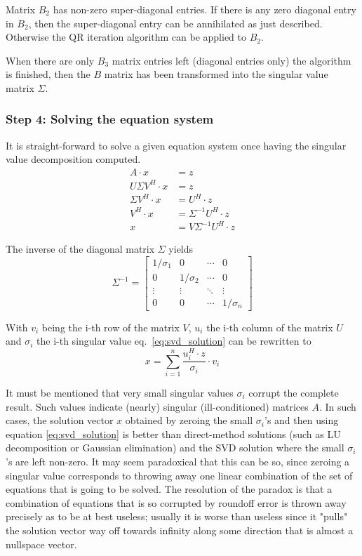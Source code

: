 Matrix $B_2$ has non-zero super-diagonal entries.  If there is any
zero diagonal entry in $B_2$, then the super-diagonal entry can be
annihilated as just described.  Otherwise the QR iteration algorithm
can be applied to $B_2$.

\addvspace{12pt}

When there are only $B_3$ matrix entries left (diagonal entries only)
the algorithm is finished, then the $B$ matrix has been transformed
into the singular value matrix $\Sigma$.

\subsubsection{Step 4: Solving the equation system}

It is straight-forward to solve a given equation system once having
the singular value decomposition computed.
\begin{align}
A\cdot x &= z\\
U\Sigma V^H\cdot x &= z\\
\Sigma V^H\cdot x &= U^H \cdot z\\
V^H\cdot x &= \Sigma^{-1} U^H \cdot z\\
x &= V\Sigma^{-1} U^H \cdot z
\label{eq:svd_solution}
\end{align}

The inverse of the diagonal matrix $\Sigma$ yields
\begin{equation}
\Sigma^{-1} =
\begin{bmatrix}
1/\sigma_1 & 0 & \cdots & 0\\
0 & 1/\sigma_2 & \cdots & 0\\
\vdots & \vdots & \ddots & \vdots\\
0 & 0 & \cdots & 1/\sigma_n
\end{bmatrix}
\end{equation}

With $v_i$ being the i-th row of the matrix $V$, $u_i$ the i-th column
of the matrix $U$ and $\sigma_i$ the i-th singular value
eq.~\eqref{eq:svd_solution} can be rewritten to
\begin{equation}
x = \sum_{i=1}^{n} \dfrac{u_i^H\cdot z}{\sigma_i}\cdot v_i
\end{equation}

It must be mentioned that very small singular values $\sigma_i$
corrupt the complete result.  Such values indicate (nearly) singular
(ill-conditioned) matrices $A$.  In such cases, the solution vector
$x$ obtained by zeroing the small $\sigma_i$'s and then using equation
\eqref{eq:svd_solution} is better than direct-method solutions (such
as LU decomposition or Gaussian elimination) and the SVD solution
where the small $\sigma_i$'s are left non-zero. It may seem
paradoxical that this can be so, since zeroing a singular value
corresponds to throwing away one linear combination of the set of
equations that is going to be solved.  The resolution of the paradox
is that a combination of equations that is so corrupted by roundoff
error is thrown away precisely as to be at best useless; usually it is
worse than useless since it "pulls" the solution vector way off
towards infinity along some direction that is almost a nullspace
vector.

